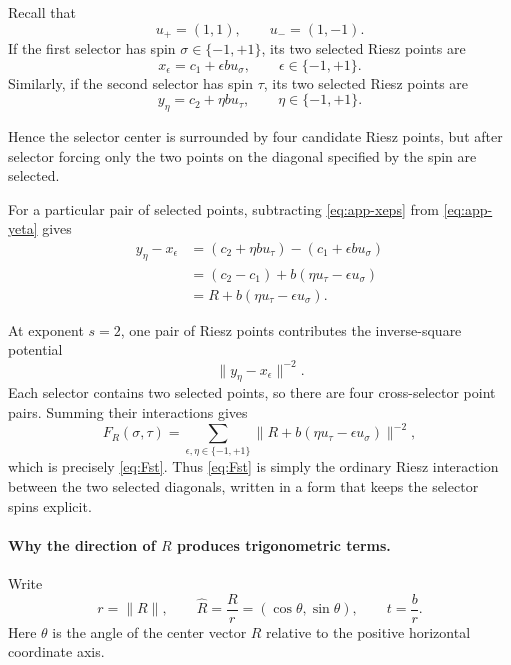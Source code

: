 \documentclass[12pt,a4paper]{article}
\newcommand{\norm}[1]{\lVert #1\rVert}
\newcommand{\sgnspin}{\{-1,+1\}}
\begin{document}
Recall that
\[
u_+=(1,1),
\qquad
u_-=(1,-1).
\]
If the first selector has spin $\sigma\in\{-1,+1\}$, its two selected
Riesz points are
\begin{equation}
\label{eq:app-xeps}
x_\epsilon=c_1+\epsilon b u_\sigma,
\qquad
\epsilon\in\{-1,+1\}.
\end{equation}
Similarly, if the second selector has spin $\tau$, its two selected
Riesz points are
\begin{equation}
\label{eq:app-yeta}
y_\eta=c_2+\eta b u_\tau,
\qquad
\eta\in\{-1,+1\}.
\end{equation}

Hence the selector center is surrounded by four candidate Riesz
points, but after selector forcing only the two points on the diagonal
specified by the spin are selected.

For a particular pair of selected points, subtracting
\eqref{eq:app-xeps} from \eqref{eq:app-yeta} gives
\begin{align}
y_\eta-x_\epsilon
&=
(c_2+\eta b u_\tau)
-
(c_1+\epsilon b u_\sigma)
\nonumber\\
&=
(c_2-c_1)
+
b(\eta u_\tau-\epsilon u_\sigma)
\nonumber\\
&=
R+b(\eta u_\tau-\epsilon u_\sigma).
\label{eq:app-displacement}
\end{align}

At exponent $s=2$, one pair of Riesz points contributes the
inverse-square potential
\[
\norm{y_\eta-x_\epsilon}^{-2}.
\]
Each selector contains two selected points, so there are four
cross-selector point pairs.  Summing their interactions gives
\[
F_R(\sigma,\tau)
=
\sum_{\epsilon,\eta\in\sgnspin}
\norm{R+b(\eta u_\tau-\epsilon u_\sigma)}^{-2},
\]
which is precisely \eqref{eq:Fst}.  Thus \eqref{eq:Fst} is simply the
ordinary Riesz interaction between the two selected diagonals, written
in a form that keeps the selector spins explicit.

\paragraph{Why the direction of $R$ produces trigonometric terms.}

Write
\begin{equation}
\label{eq:app-polarR}
r=\norm R,
\qquad
\widehat R=\frac{R}{r}
=(\cos\theta,\sin\theta),
\qquad
t=\frac br.
\end{equation}
Here $\theta$ is the angle of the center vector $R$ relative to the
positive horizontal coordinate axis.
\end{document}

